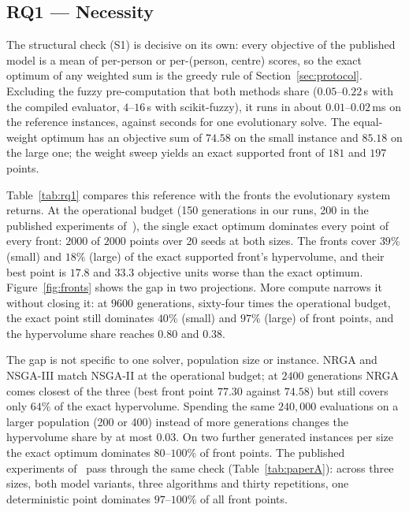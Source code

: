 \documentclass[systems,article,submit,moreauthors,pdftex]{Definitions/mdpi}
\begin{document}
\subsection{RQ1 --- Necessity}\label{sec:rq1}
The structural check (S1) is decisive on its own: every objective of the published model
is a mean of per-person or per-(person, centre) scores, so the exact optimum of any
weighted sum is the greedy rule of Section~\ref{sec:protocol}. Excluding the fuzzy
pre-computation that both methods share ($0.05$--$0.22$\,s with the compiled evaluator,
$4$--$16$\,s with scikit-fuzzy), it runs in
about $0.01$--$0.02$\,ms on the reference instances, against seconds for one evolutionary
solve.
The equal-weight optimum has an objective sum of $74.58$ on the small instance and $85.18$
on the large one; the weight sweep yields an exact supported front of $181$ and $197$
points.

Table~\ref{tab:rq1} compares this reference with the fronts the evolutionary system
returns. At the operational budget (150 generations in our runs, 200 in the published
experiments of~\cite{rabiei2026resilient}), the
single exact optimum dominates every point of every front: $2000$ of $2000$ points over
20 seeds at both sizes. The fronts cover $39\%$ (small) and $18\%$ (large) of the exact
supported front's hypervolume, and their best point is $17.8$ and $33.3$ objective units
worse than the exact optimum. Figure~\ref{fig:fronts} shows the gap in two projections.
More compute narrows it without closing it: at $9600$ generations, sixty-four times the
operational budget, the exact point still dominates $40\%$ (small) and $97\%$ (large) of
front points, and the hypervolume share reaches $0.80$ and $0.38$.

The gap is not specific to one solver, population size or instance. NRGA and NSGA-III
match NSGA-II at the operational budget; at $2400$ generations NRGA comes closest of the
three (best front point $77.30$ against $74.58$) but still covers only $64\%$ of the exact
hypervolume. Spending the same $240{,}000$ evaluations on a larger population (200 or 400)
instead of more generations changes the hypervolume share by at most $0.03$. On two further
generated instances per size the exact optimum dominates $80$--$100\%$ of front points.
The published experiments of~\cite{rabiei2026resilient} pass through the same check
(Table~\ref{tab:paperA}): across three sizes, both model variants, three algorithms and
thirty repetitions, one deterministic point dominates $97$--$100\%$ of all front points.
\end{document}

